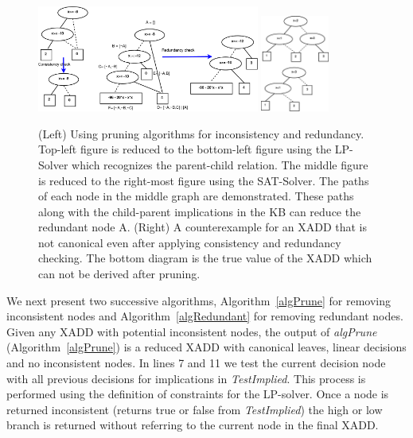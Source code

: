 \documentclass[twoside,11pt]{article}
\begin{document}
\vspace{10mm}
\begin{figure}[t!]
\centering
\includegraphics[width=0.65\textwidth]{Figures1/diagrams/redundancy.pdf}
\hspace{10mm}
\includegraphics[width=0.2\textwidth]{Figures2/diagrams/counterexample.pdf}
\vspace{-2mm}

\caption{\footnotesize (Left) Using pruning algorithms for inconsistency and redundancy. Top-left figure is reduced to the bottom-left figure using the LP-Solver which recognizes the parent-child relation. The middle figure is reduced to the right-most figure using the SAT-Solver. The paths of each node in the middle graph are demonstrated. These paths along with the child-parent implications in the KB can reduce the redundant node A. (Right) A counterexample for an XADD that is not canonical even after applying consistency and redundancy checking. The bottom diagram is the true value of the XADD which can not be derived after pruning.}
\label{fig:canonical}
\vspace{-6mm}
\end{figure}
We next present two successive algorithms, Algorithm~\ref{algPrune} for removing inconsistent nodes and Algorithm~\ref{algRedundant} for removing redundant nodes. 
Given any XADD with potential inconsistent nodes, the output of \emph{algPrune} (Algorithm~\ref{algPrune}) is a reduced XADD with canonical leaves, linear decisions and no inconsistent nodes. 
In lines 7 and 11 we test the current decision node with all previous decisions for implications in \emph{TestImplied}. 
This process is performed using the definition of constraints for the LP-solver. Once a node is returned inconsistent (returns true or false from \emph{TestImplied}) the high or low branch is returned without referring to the current node in the final XADD. 
\end{document}
